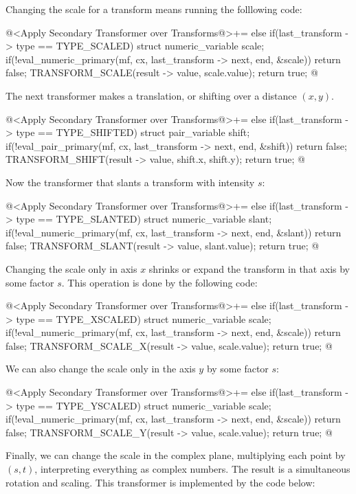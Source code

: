 Changing the scale for a transform means running the folllowing code:

\iniciocodigo
@<Apply Secondary Transformer over Transforms@>+=
else if(last_transform -> type == TYPE_SCALED){
  struct numeric_variable scale;
  if(!eval_numeric_primary(mf, cx, last_transform -> next, end, &scale))
    return false;
  TRANSFORM_SCALE(result -> value, scale.value);
  return true;
}
@
\fimcodigo

The next transformer makes a translation, or shifting over a distance
$(x, y)$.

\iniciocodigo
@<Apply Secondary Transformer over Transforms@>+=
else if(last_transform -> type == TYPE_SHIFTED){
  struct pair_variable shift;
  if(!eval_pair_primary(mf, cx, last_transform -> next, end, &shift))
    return false;
  TRANSFORM_SHIFT(result -> value, shift.x, shift.y);
  return true;
}
@
\fimcodigo


Now the transformer that slants a transform with intensity $s$:

\iniciocodigo
@<Apply Secondary Transformer over Transforms@>+=
else if(last_transform -> type == TYPE_SLANTED){
  struct numeric_variable slant;
  if(!eval_numeric_primary(mf, cx, last_transform -> next, end, &slant))
    return false;
  TRANSFORM_SLANT(result -> value, slant.value);
  return true;
}
@
\fimcodigo

Changing the scale only in axis $x$ shrinks or expand the transform in
that axis by some factor $s$. This operation is done by the following
code:

\iniciocodigo
@<Apply Secondary Transformer over Transforms@>+=
else if(last_transform -> type == TYPE_XSCALED){
  struct numeric_variable scale;
  if(!eval_numeric_primary(mf, cx, last_transform -> next, end, &scale))
    return false;
  TRANSFORM_SCALE_X(result -> value, scale.value);
  return true;
}
@
\fimcodigo

We can also change the scale only in the axis $y$ by some factor $s$:

\iniciocodigo
@<Apply Secondary Transformer over Transforms@>+=
else if(last_transform -> type == TYPE_YSCALED){
  struct numeric_variable scale;
  if(!eval_numeric_primary(mf, cx, last_transform -> next, end, &scale))
    return false;
  TRANSFORM_SCALE_Y(result -> value, scale.value);
  return true;
}
@
\fimcodigo

Finally, we can change the scale in the complex plane, multiplying
each point by $(s, t)$, interpreting everything as complex
numbers. The result is a simultaneous rotation and scaling. This
transformer is implemented by the code below:

